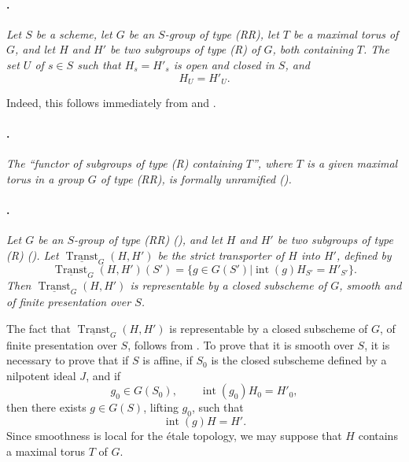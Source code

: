 \paragraph{.}
\textit{Let \(S\) be a scheme, let \(G\) be an \(S\)-group of type
\textup{(RR)}, let \(T\) be a maximal torus of \(G\), and let \(H\)
and \(H'\) be two subgroups of type \textup{(R)} of \(G\), both
containing \(T\). The set \(U\) of \(s\in S\) such that
\(H_s=H'_s\) is open and closed in \(S\), and}
\[
  H_U=H'_U.
\]

Indeed, this follows immediately from  and .

\paragraph{.}
\textit{The ``functor of subgroups of type \textup{(R)} containing
\(T\)'', where \(T\) is a given maximal torus in a group \(G\) of
type \textup{(RR)}, is formally unramified \textup{()}.}

\paragraph{.}
\textit{Let \(G\) be an \(S\)-group of type \textup{(RR)}
\textup{()}, and let \(H\) and \(H'\) be two subgroups of type
\textup{(R)} \textup{()}. Let
\(\underline{\operatorname{Transt}}_G(H,H')\) be the strict
transporter of \(H\) into \(H'\), defined by}
\[
  \underline{\operatorname{Transt}}_G(H,H')(S')
  =
  \bigl\{
    g\in G(S')
    \mathrel{\big|}
    \operatorname{int}(g)H_{S'}=H'_{S'}
  \bigr\}.
\]
\textit{Then \(\underline{\operatorname{Transt}}_G(H,H')\) is
representable by a closed subscheme of \(G\), smooth and of finite
presentation over \(S\).}

The fact that
\(\underline{\operatorname{Transt}}_G(H,H')\) is representable by
a closed subscheme of \(G\), of finite presentation over \(S\),
follows from  \textup{}. To prove that it is
smooth over \(S\), it is necessary to prove that if \(S\) is affine,
if \(S_0\) is the closed subscheme defined by a nilpotent ideal
\(J\), and if
\[
  g_0\in G(S_0),
  \qquad
  \operatorname{int}(g_0)H_0=H'_0,
\]
then there exists \(g\in G(S)\), lifting \(g_0\), such that
\[
  \operatorname{int}(g)H=H'.
\]
Since smoothness is local for the étale topology, we may suppose
that \(H\) contains a maximal torus \(T\) of \(G\).


